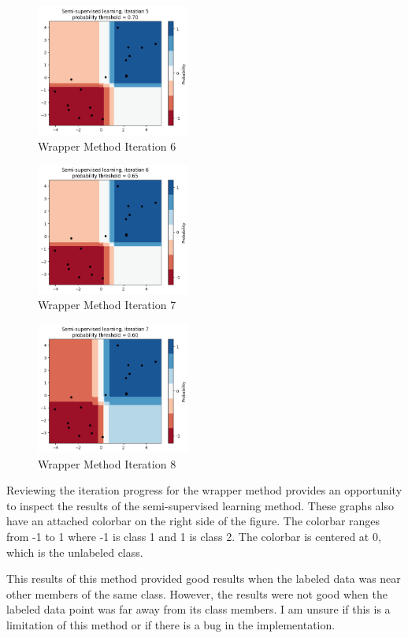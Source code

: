\begin{figure}[H]
    \centering
    \includegraphics[width=0.45\textwidth]{images/img10.png}
    \caption{Wrapper Method Iteration 6}
    \label{fig:img10}
\end{figure}

\begin{figure}[H]
    \centering
    \includegraphics[width=0.45\textwidth]{images/img11.png}
    \caption{Wrapper Method Iteration 7}
    \label{fig:img11}
\end{figure}

\begin{figure}[H]
    \centering
    \includegraphics[width=0.45\textwidth]{images/img12.png}
    \caption{Wrapper Method Iteration 8}
    \label{fig:img12}
\end{figure}


Reviewing the iteration progress for the wrapper method provides an opportunity to inspect the results of the semi-supervised learning method. These graphs also have an attached colorbar on the right side of the figure. The colorbar ranges from -1 to 1 where -1 is class 1 and 1 is class 2. The colorbar is centered at 0, which is the unlabeled class.\par
This results of this method provided good results when the labeled data was near other members of the same class. However, the results were not good when the labeled data point was far away from its class members. I am unsure if this is a limitation of this method or if there is a bug in the implementation.

